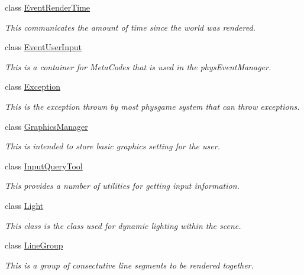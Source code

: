 \begin{DoxyCompactItemize}
class \hyperlink{classphys_1_1EventRenderTime}{EventRenderTime}
\begin{DoxyCompactList}\small\item\em This communicates the amount of time since the world was rendered. \item\end{DoxyCompactList}\item 
class \hyperlink{classphys_1_1EventUserInput}{EventUserInput}
\begin{DoxyCompactList}\small\item\em This is a container for MetaCodes that is used in the physEventManager. \item\end{DoxyCompactList}\item 
class \hyperlink{classphys_1_1Exception}{Exception}
\begin{DoxyCompactList}\small\item\em This is the exception thrown by most physgame system that can throw exceptions. \item\end{DoxyCompactList}\item 
class \hyperlink{classphys_1_1GraphicsManager}{GraphicsManager}
\begin{DoxyCompactList}\small\item\em This is intended to store basic graphics setting for the user. \item\end{DoxyCompactList}\item 
class \hyperlink{classphys_1_1InputQueryTool}{InputQueryTool}
\begin{DoxyCompactList}\small\item\em This provides a number of utilities for getting input information. \item\end{DoxyCompactList}\item 
class \hyperlink{classphys_1_1Light}{Light}
\begin{DoxyCompactList}\small\item\em This class is the class used for dynamic lighting within the scene. \item\end{DoxyCompactList}\item 
class \hyperlink{classphys_1_1LineGroup}{LineGroup}
\begin{DoxyCompactList}\small\item\em This is a group of consectutive line segments to be rendered together. \item\end{DoxyCompactList}\item 

\end{DoxyCompactItemize}

